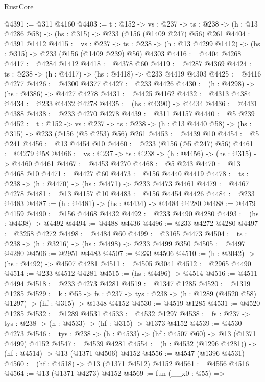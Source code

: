 \begin{lexlean}{RustCore}
\begin{coremodule}
@4391 := @311 @4160
@4403 := {t : @152} ->
  {vs : @237} ->
  {ts : @238} -> (h : @13 @4286 @58) -> (hs : @315) -> @233 (@156 (@1409 @247) @56) @261
@4404 := @4391 @1412
@4415 := {vs : @237} ->
  {ts : @238} -> (h : @13 @4299 @1412) -> (hs : @315) -> @233 (@156 (@1409 @239) @56) @4303
@4416 := @4404 @4268
@4417 := @4284 @1412
@4418 := @4378 @60
@4419 := @4287 @4369
@4424 := {ts : @238} -> (h : @4417) -> (hs : @4418) -> @233 @4419 @4303
@4425 := @4416 @4277
@4426 := @4300 @4377
@4427 := @233 @4426
@4430 := (h : @4298) -> (hs : @4386) -> @4427 @4278
@4431 := @4425 @4162
@4432 := @4313 @4384
@4434 := @233 @4432 @4278
@4435 := (hs : @4390) -> @4434
@4436 := @4431 @4388
@4438 := @233 @4270 @4278
@4439 := @311 @4157
@4440 := @5 @239
@4452 := {t : @152} ->
  {vs : @237} -> {ts : @238} -> (h : @13 @4440 @58) -> (hs : @315) -> @233 (@156 (@5 @253) @56) @261
@4453 := @4439 @10
@4454 := @5 @241
@4456 := @13 @4454 @10
@4460 := @233 (@156 (@5 @247) @56)
@4461 := @4279 @58
@4466 := {vs : @237} -> {ts : @238} -> (h : @4456) -> (hs : @315) -> @4460 @4461
@4467 := @4453 @4270
@4468 := @5 @243
@4470 := @13 @4468 @10
@4471 := @4427 @60
@4473 := @156 @4440 @4419
@4478 := {ts : @238} -> (h : @4470) -> (hs : @4471) -> @233 @4473 @4461
@4479 := @4467 @4278
@4481 := @13 @4157 @10
@4483 := @156 @4454 @4426
@4484 := @233 @4483
@4487 := (h : @4481) -> (hs : @4434) -> @4484 @4280
@4488 := @4479 @4159
@4490 := @156 @4468 @4432
@4492 := @233 @4490 @4280
@4493 := (hs : @4438) -> @4492
@4494 := @4488 @4436
@4496 := @233 @4272 @4280
@4497 := @3258 @4272
@4498 := @4484 @60
@4499 := @3165 @4473
@4504 := {ts : @238} -> (h : @3216) -> (hs : @4498) -> @233 @4499 @350
@4505 := @4497 @4280
@4506 := @2951 @4483
@4507 := @233 @4506
@4510 := (h : @3042) -> (hs : @4492) -> @4507 @4281
@4511 := @4505 @3041
@4512 := @2965 @4490
@4514 := @233 @4512 @4281
@4515 := (hs : @4496) -> @4514
@4516 := @4511 @4494
@4518 := @233 @4273 @4281
@4519 := @1347 @1285
@4520 := @1319 @1285
@4529 := {k : @55} ->
  {fs : @237} -> {tys : @238} -> (h : @1289 (@4520 @58) @1297) -> (hf : @315) -> @1348 @4152
@4530 := @4519 @1285
@4531 := @4520 @1285
@4532 := @1289 @4531
@4533 := @4532 @1297
@4538 := {fs : @237} -> {tys : @238} -> (h : @4533) -> (hf : @315) -> @1373 @4152
@4539 := @4530 @4273
@4546 := {tys : @238} -> (h : @4533) -> (hf : @4507 @60) -> @13 (@1371 @4499) @4152
@4547 := @4539 @4281
@4554 := (h : @4532 (@1296 @4281)) -> (hf : @4514) -> @13 (@1371 @4506) @4152
@4556 := @4547 (@1396 @4531)
@4560 := (hf : @4518) -> @13 (@1371 @4512) @4152
@4561 := @4556 @4516
@4564 := @13 (@1371 @4273) @4152
@4569 := fun (__x0 : @55) =>

\end{coremodule}
\end{lexlean}
